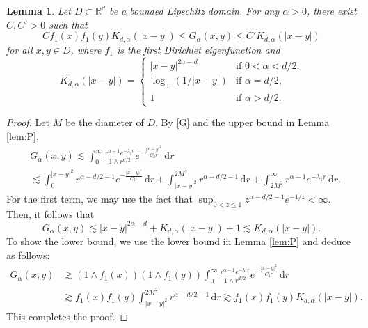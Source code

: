\documentclass[reqno]{amsart}
\newcommand{\R}{\mathbb R}
\renewcommand{\d}{\mathrm d}
\newcommand{\1}{\mathbf 1}
\numberwithin{equation}{section}
\newtheorem{lemma}[theorem]{Lemma}
\theoremstyle{definition}
\begin{document}
\begin{lemma}\label{lem:G:bd}
Let $D \subset \R^d$ be a bounded Lipschitz domain.
For any $\alpha>0$, there exist $C,C'>0$ such that
\[
	C f_1(x)f_1(y) K_{d,\alpha}(|x-y|) \le  G_\alpha(x,y) \le C' K_{d,\alpha}(|x-y|)
\]
for all $x,y \in D$, where $f_1$ is the first Dirichlet eigenfunction and
\[
	K_{d,\alpha}(|x-y|) = \begin{cases}
	|x-y|^{2\alpha-d}& \text{if $0<\alpha<d/2$,}\\
	\log_+(1/|x-y|) & \text{if $\alpha=d/2$,}\\
	1 & \text{if $\alpha>d/2$.}
	\end{cases}
\]
\end{lemma}

\begin{proof}
Let $M$ be the diameter of $D$.
By \eqref{G} and the upper bound in Lemma \ref{lem:P},
\begin{align*}
	&G_\alpha(x,y) 
	\lesssim \int_0^\infty \frac{r^{\alpha-1} e^{-\lambda_1 r}}{1\wedge r^{d/2}} e^{-\frac{|x-y|^2}{C_2 r}}\, \d r\\
	& \lesssim \int_0^{|x-y|^2} r^{\alpha-d/2-1} e^{-\frac{|x-y|^2}{C_2r}} \, \d r + \int_{|x-y|^2}^{2M^2} r^{\alpha-d/2-1} \, \d r + \int_{2M^2}^\infty r^{\alpha-1} e^{-\lambda_1 r} \, \d r.
\end{align*}
For the first term, we may use the fact that $\sup_{0<z \le 1} z^{\alpha-d/2-1}e^{-1/z} < \infty$. Then, it follows that
\[
	G_\alpha(x,y) \lesssim |x-y|^{2\alpha-d} + K_{d,\alpha}(|x-y|) + 1 \lesssim K_{d,\alpha}(|x-y|).
\]
To show the lower bound, we use the lower bound in Lemma \ref{lem:P} and deduce as follows:
\begin{align*}
	G_\alpha(x,y) &\gtrsim (1\wedge f_1(x))(1\wedge f_1(y)) \int_0^\infty \frac{r^{\alpha-1} e^{-\lambda_1 r}}{1\wedge r^{d/2}} e^{-\frac{|x-y|^2}{C_1 r}}\, \d r\\
	& \gtrsim f_1(x)f_1(y) \int_{|x-y|^2}^{2M^2} r^{\alpha-d/2-1} \, \d r \gtrsim f_1(x) f_1(y) K_{d,\alpha}(|x-y|).
\end{align*}
This completes the proof.
\end{proof}
\end{document}
